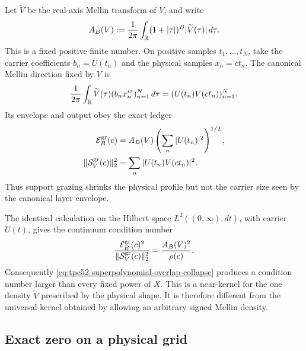 Let \(\widetilde V\) be the real-axis Mellin transform of \(V\), and
write
\begin{equation}
 A_B(V):=\frac1{2\pi}\int_\mathbb R
 (1+|\tau|)^B|\widetilde V(\tau)|\,d\tau.
 \label{eq:tpc52-grazing-Wiener-mass}
\end{equation}
This is a fixed positive finite number.  On positive samples
\(t_1,\ldots,t_N\), take the carrier coefficients
\(b_n=U(t_n)\) and the physical samples \(x_n=ct_n\).  The canonical
Mellin direction fixed by \(V\) is
\begin{equation}
 \frac1{2\pi}\int_\mathbb R\widetilde V(\tau)
 (b_nx_n^{i\tau})_{n=1}^N\,d\tau
 =(U(t_n)V(ct_n))_{n=1}^N.
 \label{eq:tpc52-grazing-actual-direction}
\end{equation}
Its envelope and output obey the exact ledger
\begin{align}
 \mathcal E_B^{\rm gr}(c)&=A_B(V)
  \left(\sum_n|U(t_n)|^2\right)^{1/2},
 \label{eq:tpc52-grazing-envelope}\\
 \|\mathcal S_V^{\rm gr}(c)\|_2^2
 &=\sum_n|U(t_n)V(ct_n)|^2.
 \label{eq:tpc52-grazing-output}
\end{align}
Thus support grazing shrinks the physical profile but not the carrier
size seen by the canonical layer envelope.

The identical calculation on the Hilbert space
\(L^2((0,\infty),dt)\), with carrier \(U(t)\), gives the continuum
condition number
\begin{equation}
 \frac{\mathcal E_B^{\rm gr}(c)^2}{\|\mathcal S_V^{\rm gr}(c)\|_2^2}
 =\frac{A_B(V)^2}{\rho(c)}.
 \label{eq:tpc52-grazing-condition-number}
\end{equation}
Consequently \eqref{eq:tpc52-superpolynomial-overlap-collapse}
produces a condition number larger than every fixed power of \(X\).
This is a near-kernel for the one density \(\widetilde V\) prescribed by
the physical shape.  It is therefore different from the universal
kernel obtained by allowing an arbitrary signed Mellin density.

\subsection{Exact zero on a physical grid}

